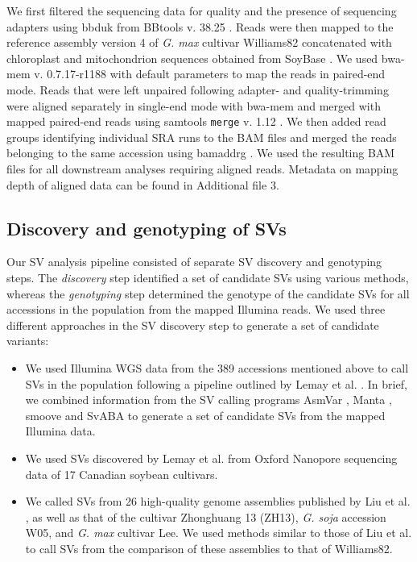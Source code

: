 \documentclass[doublespacing]{bmcart}
\begin{document}
We first filtered the sequencing data for quality and the presence of sequencing
adapters using bbduk from BBtools v. 38.25
\cite{bbtools}. Reads
were then mapped to the reference assembly version 4 of \emph{G. max}
cultivar Williams82 \citep{valliyodan2019} concatenated with chloroplast
and mitochondrion sequences obtained from SoyBase \citep{grant2010}. We used
bwa-mem v. 0.7.17-r1188 \citep{li2009-bwa} with default parameters to map the
reads in paired-end mode. Reads that were left unpaired following adapter- and
quality-trimming were aligned separately in single-end mode with bwa-mem and
merged with mapped paired-end reads using samtools \texttt{merge}
v. 1.12 \citep{li2009-samtools}.  We then added read groups identifying
individual SRA runs to the BAM files and merged the reads belonging to the same
accession using bamaddrg
\cite{bamaddrg}. We used the
resulting BAM files for all downstream analyses requiring aligned reads.
Metadata on mapping depth of aligned data can be found in Additional file 3.

\subsection*{Discovery and genotyping of SVs}

Our SV analysis pipeline consisted of separate SV discovery and genotyping steps.
The \emph{discovery} step identified a set of candidate SVs using various methods,
whereas the \emph{genotyping} step determined the genotype
of the candidate SVs for all accessions in the population from the mapped Illumina reads. We used three different
approaches in the SV discovery step to generate a set of candidate variants:

\begin{itemize}
	\item We used Illumina WGS data from the 389 accessions mentioned above
		to call SVs in the population following a pipeline outlined
		by Lemay et al. \cite{lemay2022}. In brief, we combined information from
		the SV calling programs AsmVar \citep{liu2015}, Manta \citep{chen2016},
		smoove \citep{pedersen2019} and SvABA \citep{wala2018} to generate
		a set of candidate SVs from the mapped Illumina data.
	\item We used SVs discovered by Lemay et al. \cite{lemay2022} from Oxford Nanopore
		sequencing data of 17 Canadian soybean cultivars.
	\item We called SVs from 26 high-quality genome assemblies published by
		Liu et al. \cite{liu2020-pangenome}, as well as that of the cultivar Zhonghuang 13 (ZH13),
		\textit{G. soja} accession W05, and \textit{G. max} cultivar Lee.
		We used methods similar to those of Liu et al. \cite{liu2020-pangenome} to call
		SVs from the comparison of these assemblies to that of Williams82.
\end{itemize}
\end{document}
